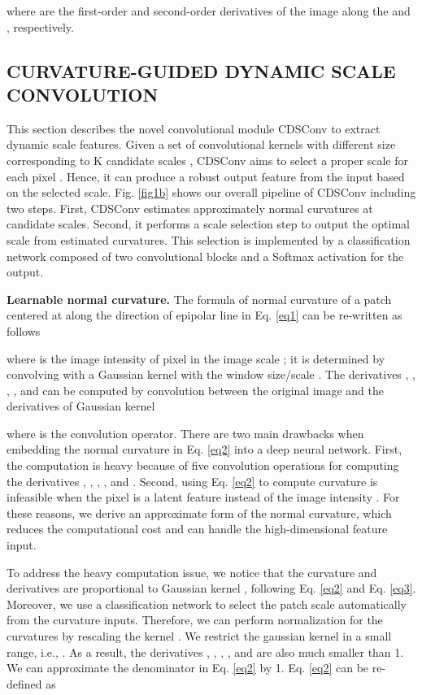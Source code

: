 \documentclass{article} \usepackage{iclr2022_conference,times}
\begin{document}
where  are the first-order and second-order derivatives of the image  along the  and , respectively.

\subsection{CURVATURE-GUIDED DYNAMIC SCALE CONVOLUTION}
\label{cdsconv}
This section describes the novel convolutional module CDSConv to extract dynamic scale features. Given a set of  convolutional kernels with different size  corresponding to K candidate scales , CDSConv aims to select a proper scale for each pixel . Hence, it can produce a robust output feature  from the input  based on the selected scale. Fig. \ref{fig1b} shows our overall pipeline of CDSConv including two steps. First, CDSConv estimates approximately normal curvatures at  candidate scales. Second, it performs a scale selection step to output the optimal scale from  estimated curvatures. This selection is implemented by a classification network composed of two convolutional blocks and a Softmax activation for the output.

\textbf{Learnable normal curvature.} The formula of normal curvature of a patch centered at  along the direction of epipolar line  in Eq. \ref{eq1} can be re-written as follows

where  is the image intensity of pixel  in the image scale ; it is determined by convolving  with a Gaussian kernel  with the window size/scale  \citep{lindeberg1994scale}. The derivatives , , , , and  can be computed by convolution between the original image  and the derivatives of Gaussian kernel 

where  is the convolution operator.
There are two main drawbacks when embedding the normal curvature in Eq. \ref{eq2} into a deep neural network. First, the computation is heavy because of five convolution operations for computing the derivatives , , , , and . Second, using Eq. \ref{eq2} to compute curvature is infeasible when the pixel  is a latent feature  instead of the image intensity . For these reasons, we derive an approximate form of the normal curvature, which reduces the computational cost and can handle the high-dimensional feature input. 

To address the heavy computation issue, we notice that the curvature  and derivatives   are proportional to Gaussian kernel , following Eq. \ref{eq2} and Eq. \ref{eq3}. Moreover, we use a classification network to select the patch scale automatically from the curvature inputs. Therefore, we can perform normalization for the curvatures by rescaling the kernel . We restrict the gaussian kernel in a small range, i.e., . As a result, the derivatives , , , , and  are also much smaller than 1. We can approximate the denominator in Eq. \ref{eq2} by 1. Eq. \ref{eq2} can be re-defined as
\end{document}
